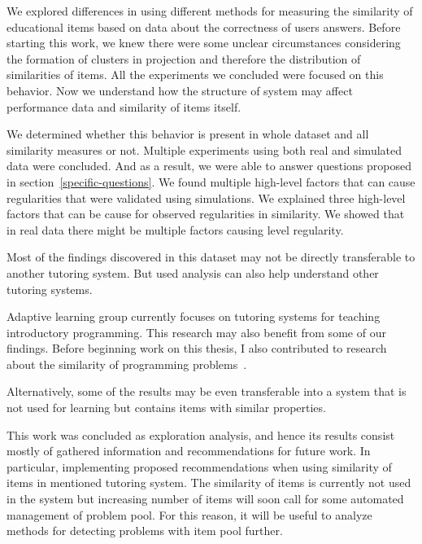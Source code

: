 \documentclass[
  printed, %
  table,   %
  nolof,     %
  nolot,     %
  color,
  final,
  nocover
]{fithesis3}
\begin{document}

We explored differences in using different methods for measuring the similarity of educational items based on data about the correctness of users answers. Before starting this work, we knew there were some unclear circumstances considering the formation of clusters in projection and therefore the distribution of similarities of items. All the experiments we concluded were focused on this behavior. Now we understand how the structure of system may affect performance data and similarity of items itself.

We determined whether this behavior is present in whole dataset and all similarity measures or not. Multiple experiments using both real and simulated data were concluded. And as a result, we were able to answer questions proposed in section~\ref{specific-questions}. We found multiple high-level factors that can cause regularities that were validated using simulations. We explained three high-level factors that can be cause for observed regularities in similarity. We showed that in real data there might be multiple factors causing level regularity.

Most of the findings discovered in this dataset may not be directly transferable to another tutoring system. But used analysis can also help understand other tutoring systems.


Adaptive learning group currently focuses on tutoring systems for teaching introductory programming. This research may also benefit from some of our findings. Before beginning work on this thesis, I also contributed to research about the similarity of programming problems~\cite{pelanek2018programming}.

Alternatively, some of the results may be even transferable into a system that is not used for learning but contains items with similar properties.


This work was concluded as exploration analysis, and hence its results consist mostly of gathered information and recommendations for future work. In particular, implementing proposed recommendations when using similarity of items in mentioned tutoring system. The similarity of items is currently not used in the system \umimeCesky{} but increasing number of items will soon call for some automated management of problem pool. For this reason, it will be useful to analyze methods for detecting problems with item pool further.
\end{document}
